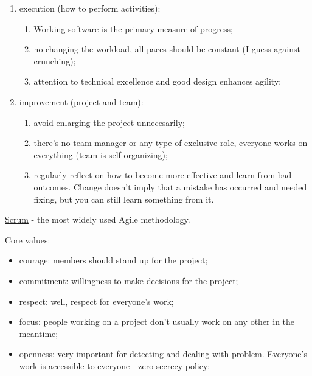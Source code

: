 \begin{enumerate}
\begin{enumerate}
    \end{enumerate}
    \item execution (how to perform activities):
    \begin{enumerate}
        \item Working software is the primary measure of progress;
        \item no changing the workload, all paces should be constant (I guess against crunching);
        \item attention to technical excellence and good design enhances agility;
    \end{enumerate}
    \item improvement (project and team):
    \begin{enumerate}
        \item avoid enlarging the project unnecesarily;
        \item there's no team manager or any type of exclusive role, everyone works on everything (team is self-organizing);
        \item regularly reflect on how to become more effective and learn from bad outcomes. Change doesn't imply that a mistake has occurred and needed fixing, but you can still learn something from it.
    \end{enumerate}
\end{enumerate}

\newpage
\noindent \underline{Scrum} - the most widely used Agile methodology.

 \noindent Core values:
 \begin{itemize}
     \item courage: members should stand up for the project;
     \item commitment: willingness to make decisions for the project;
     \item respect: well, respect for everyone's work;
     \item focus: people working on a project don't usually work on any other in the meantime;
     \item openness: very important for detecting and dealing with problem. Everyone's work is accessible to everyone - zero secrecy policy;
 \end{itemize}

